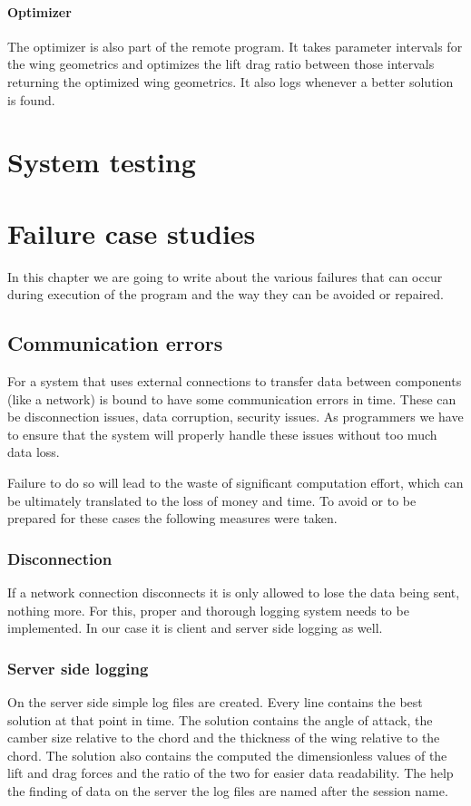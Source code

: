 \documentclass[10pt,a4paper]{report}
\begin{document}
\subsubsection{Optimizer}
The optimizer is also part of the remote program. It takes parameter intervals for the wing geometrics and optimizes the lift drag ratio between those intervals returning the optimized wing geometrics. It also logs whenever a better solution is found.


\chapter{System testing}

\chapter{Failure case studies}
In this chapter we are going to write about the various failures that can occur during execution of the program and the way they can be avoided or repaired.

\section{Communication errors}
For a system that uses external connections to transfer data between components (like a network) is bound to have some communication errors in time. These can be disconnection issues, data corruption, security issues. As programmers we have to ensure that the system will properly handle these issues without too much data loss.

Failure to do so will lead to the waste of significant computation effort, which can be ultimately translated to the loss of money and time. To avoid or to be prepared for these cases the following measures were taken.

\subsection{Disconnection}
If a network connection disconnects it is only allowed to lose the data being sent, nothing more. For this, proper and thorough logging system needs to be implemented. In our case it is client and server side logging as well.

\subsection{Server side logging}
On the server side simple log files are created. Every line contains the best solution at that point in time. The solution contains the angle of attack, the camber size relative to the chord and the thickness of the wing relative to the chord. The solution also contains the computed the dimensionless values of the lift and drag forces and the ratio of the two for easier data readability. The help the finding of data on the server the log files are named after the session name.
\end{document}
